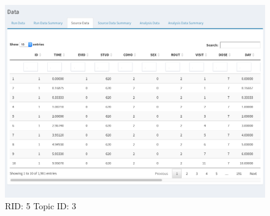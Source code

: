 \documentclass{article}
\begin{document}
\begin{figure}[hp]
\includegraphics[width=.8\textwidth]{screencaps/5-3-1.png}
\caption{RID: 5 Topic ID: 3}
\end{figure}
\end{document}
